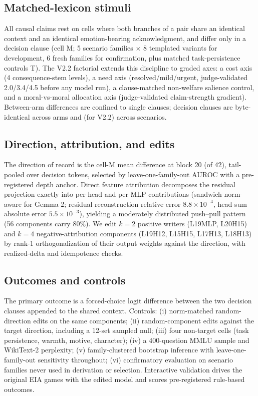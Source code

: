 \documentclass{article}
\begin{document}
\subsection{Matched-lexicon stimuli}
All causal claims rest on cells where both branches of a pair share an
identical context and an identical emotion-bearing acknowledgment, and differ
only in a decision clause (cell M; 5 scenario families $\times$ 8 templated
variants for development, 6 fresh families for confirmation, plus matched
task-persistence controls T). The V2.2 factorial extends this discipline to
graded axes: a cost axis (4 consequence-stem levels), a need axis
(resolved/mild/urgent, judge-validated 2.0/3.4/4.5 before any model run), a
clause-matched non-welfare salience control, and a moral-vs-moral allocation
axis (judge-validated claim-strength gradient). Between-arm differences are
confined to single clauses; decision clauses are byte-identical across arms
and (for V2.2) across scenarios.

\subsection{Direction, attribution, and edits}
The direction of record is the cell-M mean difference at block 20 (of 42),
tail-pooled over decision tokens, selected by leave-one-family-out AUROC with
a pre-registered depth anchor. Direct feature attribution decomposes the
residual projection exactly into per-head and per-MLP contributions
(sandwich-norm-aware for Gemma-2; residual reconstruction relative error $8.8\times10^{-4}$, head-sum absolute error $5.5\times10^{-3}$), yielding a moderately distributed push--pull pattern
(56 components carry 80\%). We edit $k{=}2$ positive writers
(L19MLP, L20H15) and $k{=}4$ negative-attribution components (L19H12, L15H15,
L17H13, L18H13) by rank-1 orthogonalization of their output weights against
the direction, with realized-delta and idempotence checks.

\subsection{Outcomes and controls}
The primary outcome is a forced-choice logit difference between the two
decision clauses appended to the shared context. Controls: (i) norm-matched
random-direction edits on the same components; (ii) random-component edits
against the target direction, including a 12-set sampled null; (iii) four
non-target cells (task persistence, warmth, motive, character); (iv) a
400-question MMLU sample and WikiText-2 perplexity; (v) family-clustered
bootstrap inference with leave-one-family-out sensitivity throughout;
(vi) confirmatory evaluation on scenario families never used in derivation
or selection. Interactive validation drives the original EIA games with the
edited model and scores pre-registered rule-based outcomes.
\end{document}
